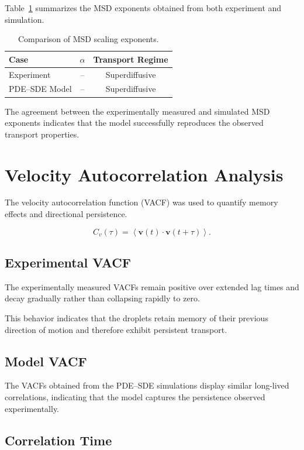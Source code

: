 Table~\ref{tab:msdcomparison} summarizes the MSD exponents obtained from both experiment and simulation.

\begin{table}[h]
\centering
\caption{Comparison of MSD scaling exponents.}
\label{tab:msdcomparison}
\begin{tabular}{lcc}
\hline
Case & $\alpha$ & Transport Regime \\
\hline
Experiment & -- & Superdiffusive \\
PDE--SDE Model & -- & Superdiffusive \\
\hline
\end{tabular}
\end{table}

The agreement between the experimentally measured and simulated MSD exponents indicates that the model successfully reproduces the observed transport properties.

\section{Velocity Autocorrelation Analysis}

The velocity autocorrelation function (VACF) was used to quantify memory effects and directional persistence.

\begin{equation}
C_v(\tau) = \left\langle \mathbf v(t)\cdot \mathbf v(t+\tau) \right\rangle.
\end{equation}

\subsection{Experimental VACF}

The experimentally measured VACFs remain positive over extended lag times and decay gradually rather than collapsing rapidly to zero.

This behavior indicates that the droplets retain memory of their previous direction of motion and therefore exhibit persistent transport.

\subsection{Model VACF}

The VACFs obtained from the PDE--SDE simulations display similar long-lived correlations, indicating that the model captures the persistence observed experimentally.

\subsection{Correlation Time}

